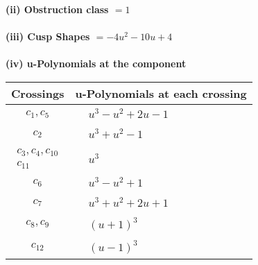 \documentclass[1p]{elsarticle_modified}
\theoremstyle{definition}
\begin{document}
\flushleft \textbf{(ii) Obstruction class $= 1$}\\~\\
\flushleft \textbf{(iii) Cusp Shapes $= -4 u^2-10 u+4$}\\~\\
\newpage\renewcommand{\arraystretch}{1}
\flushleft \textbf{(iv) u-Polynomials at the component}\newline \\
\begin{tabular}{m{50pt}|m{274pt}}
Crossings & \hspace{64pt}u-Polynomials at each crossing \\
\hline $$\begin{aligned}c_{1},c_{5}\end{aligned}$$&$\begin{aligned}
&u^3- u^2+2 u-1
\end{aligned}$\\
\hline $$\begin{aligned}c_{2}\end{aligned}$$&$\begin{aligned}
&u^3+u^2-1
\end{aligned}$\\
\hline $$\begin{aligned}c_{3},c_{4},c_{10}\\c_{11}\end{aligned}$$&$\begin{aligned}
&u^3
\end{aligned}$\\
\hline $$\begin{aligned}c_{6}\end{aligned}$$&$\begin{aligned}
&u^3- u^2+1
\end{aligned}$\\
\hline $$\begin{aligned}c_{7}\end{aligned}$$&$\begin{aligned}
&u^3+u^2+2 u+1
\end{aligned}$\\
\hline $$\begin{aligned}c_{8},c_{9}\end{aligned}$$&$\begin{aligned}
&(u+1)^3
\end{aligned}$\\
\hline $$\begin{aligned}c_{12}\end{aligned}$$&$\begin{aligned}
&(u-1)^3
\end{aligned}$\\
\hline
\end{tabular}\\~\\
\end{document}
